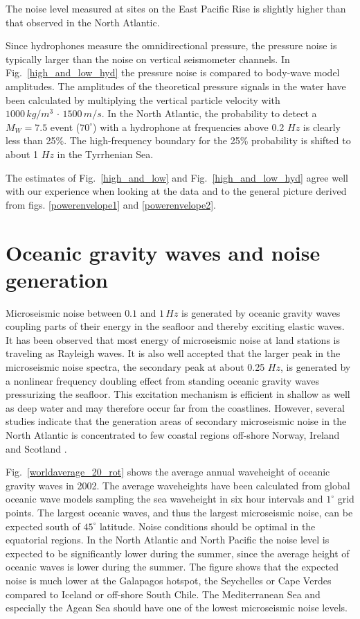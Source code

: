 \documentclass{article}
\begin{document}
{The noise level measured at sites on the East Pacific Rise 
\cite[see][figure 2]{webb:98}
is slightly higher than that observed in the North Atlantic.

Since hydrophones measure the omnidirectional pressure, the 
pressure noise is typically larger than the noise on 
vertical seismometer channels. 
In Fig.~\ref{high_and_low_hyd} the pressure noise is 
compared to body-wave model amplitudes. 
The amplitudes of the theoretical pressure signals in the water 
have been  calculated by multiplying the vertical particle
velocity with $1000 \, kg/m^3 \, \cdot \, 1500\, m/s$.
In the North Atlantic, the probability to detect a 
$M_W = 7.5$ event ($70^{\circ}$) with a hydrophone 
at frequencies above 0.2 $Hz$ is clearly less than 25\%.
The high-frequency boundary for the 25\%  probability is 
shifted to about 1 $Hz$ in the Tyrrhenian Sea.

The estimates of 
Fig.~\ref{high_and_low} and
Fig.~\ref{high_and_low_hyd} 
agree well with our experience when looking at the data
and to the general picture derived from  
figs. \ref{powerenvelope1} and \ref{powerenvelope2}.


\section{Oceanic gravity waves and noise generation}
Microseismic noise between $0.1$ and $1\, Hz$ is generated by 
oceanic gravity waves coupling parts of their energy in the 
seafloor and thereby exciting elastic waves.
It has been observed that most energy of microseismic noise at land stations
is traveling as Rayleigh waves.
It is also well accepted that the larger peak in the 
microseismic noise spectra, the secondary peak at about 0.25 $Hz$, 
is generated by a nonlinear frequency doubling effect from 
standing oceanic gravity waves pressurizing the seafloor. 
This 
excitation mechanism is efficient in shallow as well as deep water and may 
therefore occur far from the coastlines.
However, several studies indicate that the generation areas 
of secondary microseismic noise in the North Atlantic is concentrated 
to few coastal regions off-shore Norway, Ireland and Scotland
\cite[e.g.][]{essen:03}.

Fig.~\ref{worldaverage_20_rot} 
shows the average annual waveheight of oceanic gravity waves in 
2002.
The average waveheights have been calculated from 
global oceanic wave models \cite[WAM, e.g.][]{komen:94} sampling the sea waveheight in 
six hour intervals and $1^{\circ}$ grid points.
The largest oceanic waves, and thus the largest microseismic noise, can be expected
south of $45^{\circ}$ latitude.
Noise conditions should be optimal in the equatorial regions.
In the North Atlantic and North Pacific  the noise level is expected
to be significantly lower during the summer, since 
the average height of oceanic waves is lower during the summer.
The figure shows that the expected noise is much lower at the
Galapagos hotspot, the Seychelles or Cape Verdes compared to
Iceland or off-shore South Chile.
The Mediterranean Sea and especially the Agean Sea should have one
of the lowest microseismic noise levels.

}
\end{document}
